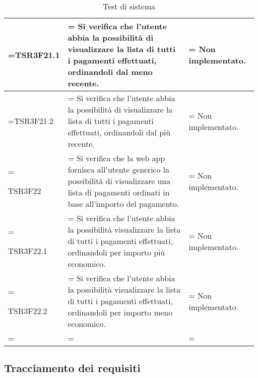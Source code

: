 \begin{xltabular}{\textwidth} {
            >{\hsize\linewidth=\hsize}X
            >{\hsize\linewidth=\hsize}X
            >{\hsize\linewidth=\hsize}X
        }
        TSR3F21.1 &
        Si verifica che l'utente abbia la possibilità di visualizzare la lista di tutti i pagamenti
        effettuati, ordinandoli dal meno recente. &
        Non implementato.
        \\ \hline

        TSR3F21.2 &
        Si verifica che l'utente abbia la possibilità di visualizzare la lista di tutti i pagamenti
        effettuati, ordinandoli dal più recente. &
        Non implementato.
        \\ \hline

        TSR3F22 &
        Si verifica che la web app fornisca all'utente generico la possibilità di visualizzare una lista di pagamenti ordinati in base all'importo del pagamento. &
        Non implementato. 
        \\ \hline

        TSR3F22.1 &
        Si verifica che l'utente abbia la possibilità visualizzare la lista di tutti i pagamenti
        effettuati, ordinandoli per importo più economico. &
        Non implementato.
        \\ \hline
        
        TSR3F22.2 &
        Si verifica che l'utente abbia la possibilità visualizzare la lista di tutti i pagamenti
        effettuati, ordinandoli per importo meno economico. &
        Non implementato.
        \\ \hline


        \caption{Test di sistema}
    \end{xltabular}

    \subsection{Tracciamento dei requisiti}

